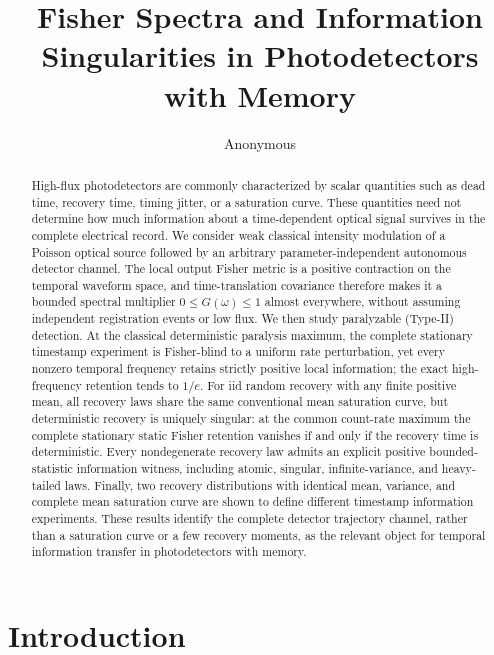 \documentclass[aps,prapplied,preprint,nofootinbib]{revtex4-2}
\begin{document}
\title{Fisher Spectra and Information Singularities in Photodetectors with Memory}
\author{Anonymous}

\begin{abstract}
High-flux photodetectors are commonly characterized by scalar quantities such as dead time, recovery time, timing jitter, or a saturation curve. These quantities need not determine how much information about a time-dependent optical signal survives in the complete electrical record. We consider weak classical intensity modulation of a Poisson optical source followed by an arbitrary parameter-independent autonomous detector channel. The local output Fisher metric is a positive contraction on the temporal waveform space, and time-translation covariance therefore makes it a bounded spectral multiplier $0\le G(\omega)\le1$ almost everywhere, without assuming independent registration events or low flux. We then study paralyzable (Type-II) detection. At the classical deterministic paralysis maximum, the complete stationary timestamp experiment is Fisher-blind to a uniform rate perturbation, yet every nonzero temporal frequency retains strictly positive local information; the exact high-frequency retention tends to $1/e$. For iid random recovery with any finite positive mean, all recovery laws share the same conventional mean saturation curve, but deterministic recovery is uniquely singular: at the common count-rate maximum the complete stationary static Fisher retention vanishes if and only if the recovery time is deterministic. Every nondegenerate recovery law admits an explicit positive bounded-statistic information witness, including atomic, singular, infinite-variance, and heavy-tailed laws. Finally, two recovery distributions with identical mean, variance, and complete mean saturation curve are shown to define different timestamp information experiments. These results identify the complete detector trajectory channel, rather than a saturation curve or a few recovery moments, as the relevant object for temporal information transfer in photodetectors with memory.
\end{abstract}

\maketitle

\section{Introduction}
\end{document}
